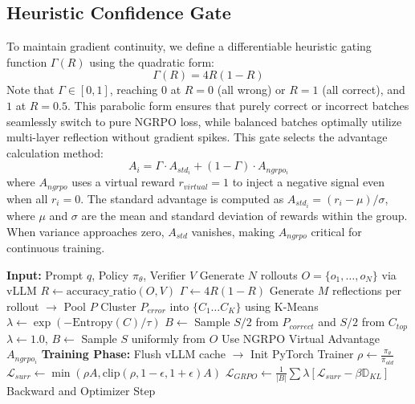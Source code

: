 \subsection{Heuristic Confidence Gate}\label{subsec:heuristic_gate}
To maintain gradient continuity, we define a differentiable heuristic gating function $\Gamma(R)$ using the quadratic form:
\begin{equation}
\Gamma(R) = 4R(1-R)
\end{equation}
Note that $\Gamma \in [0, 1]$, reaching $0$ at $R=0$ (all wrong) or $R=1$ (all correct), and $1$ at $R=0.5$. This parabolic form ensures that purely correct or incorrect batches seamlessly switch to pure NGRPO loss, while balanced batches optimally utilize multi-layer reflection without gradient spikes. This gate selects the advantage calculation method:
\begin{equation}
A_{i} = \Gamma \cdot A_{std_i} + (1-\Gamma) \cdot A_{ngrpo_i}
\end{equation}
where $A_{ngrpo}$ uses a virtual reward $r_{virtual} = 1$ to inject a negative signal even when all $r_i=0$. The standard advantage is computed as $A_{std_i} = (r_i - \mu) / \sigma$, where $\mu$ and $\sigma$ are the mean and standard deviation of rewards within the group. When variance approaches zero, $A_{std}$ vanishes, making $A_{ngrpo}$ critical for continuous training.

\begin{algorithm}
\caption{SB-GRPO Training Step}
\label{alg:training_step}
\begin{algorithmic}[1]
\STATE \textbf{Input:} Prompt $q$, Policy $\pi_\theta$, Verifier $V$
\STATE Generate $N$ rollouts $O = \{o_1, \dots, o_N\}$ via vLLM
\STATE $R \gets \text{accuracy\_ratio}(O, V)$
\STATE $\Gamma \gets 4R(1-R)$
    \STATE Generate $M$ reflections per rollout $\to$ Pool $P$
    \STATE Cluster $P_{error}$ into $\{C_1 \dots C_K\}$ using K-Means
    \STATE $\lambda \gets \exp(-\text{Entropy}(C)/\tau)$
    \STATE $B \gets$ Sample $S/2$ from $P_{correct}$ and $S/2$ from $C_{top}$
\ELSE
    \STATE $\lambda \gets 1.0$, $B \gets$ Sample $S$ uniformly from $O$
    \STATE Use NGRPO Virtual Advantage $A_{ngrpo_i}$
\ENDIF
\STATE \textbf{Training Phase:}
\STATE Flush vLLM cache $\to$ Init PyTorch Trainer
\STATE $\rho \gets \frac{\pi_\theta}{\pi_{old}}$
\STATE $\mathcal{L}_{surr} \gets \min\left(\rho A, \text{clip}\left(\rho, 1-\epsilon, 1+\epsilon\right)A\right)$
\STATE $\mathcal{L}_{GRPO} \gets \frac{1}{|B|} \sum \lambda \left[ \mathcal{L}_{surr} - \beta \mathbb{D}_{KL} \right]$
\STATE Backward and Optimizer Step
\end{algorithmic}
\end{algorithm}

